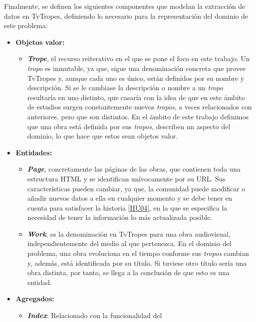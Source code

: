 Finalmente, se definen los siguientes componentes que modelan la extracción de
datos en TvTropes, definiendo lo necesario para la representación del dominio de
este problema:
\begin{itemize}
  \item \textbf{Objetos valor:}
  \begin{itemize}
    \item \textbf{\textit{Trope}}, el recurso reiterativo en el que se pone el
    foco en este trabajo. Un \textit{tropo} es inmutable, ya que, sigue una
    denominación concreta que provee TvTropes y, aunque cada uno es único, están
    definidos por su nombre y descripción. Si se le cambiase la descripción o
    nombre a un \textit{tropo} resultaría en uno distinto, que casaría con la
    idea de que en este ámbito de estudios surgen constantemente nuevos
    \textit{tropos}, a veces relacionados con anteriores, pero que son
    distintos. En el ámbito de este trabajo definimos que una obra está definida
    por sus \textit{tropos}, describen un aspecto del dominio, lo que hace que
    estos sean objetos valor. 
  \end{itemize}
  \item \textbf{Entidades:}
  \begin{itemize}
    \item \textbf{\textit{Page}}, concretamente las páginas de las obras, que
    contienen toda una estructura HTML y se identifican unívocamente por su URL.
    Sus características pueden cambiar, ya que, la comunidad puede modificar o
    añadir nuevos datos a ella en cualquier momento y se debe tener en cuenta
    para satisfacer la historia
    \href{https://github.com/jlgallego99/TropesToGo/issues/9}{[HU04]}, en la que
    se especifica la necesidad de tener la información lo más actualizada
    posible.
    \item \textbf{\textit{Work}}, es la denominación en TvTropes para una obra
    audiovisual, independientemente del medio al que pertenezca. En el dominio
    del problema, una obra evoluciona en el tiempo conforme sus \textit{tropos}
    cambian y, además, está identificada por su título. Si tuviese otro título
    sería una obra distinta, por tanto, se llega a la conclusión de que esto es
    una entidad.
  \end{itemize}
  \item \textbf{Agregados:}
  \begin{itemize}
    \item \textbf{\textit{Index}}: Relacionado con la funcionalidad del

\end{itemize}
\end{itemize}
